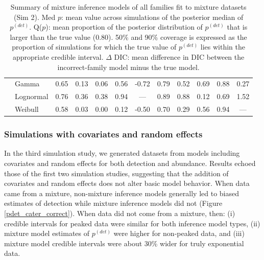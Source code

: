 \documentclass[useAMS,usenatbib,referee,12pt]{article}
\begin{document}
\begin{table}[ht]
\begin{tabular}{l|l|ccccc|ccccc}
\cline{2-12}
\parbox[t]{2mm}{} & Gamma & 0.65 & 0.13 & 0.06 & 0.56 & -0.72 & 0.79 & 0.52 & 0.69 & 0.88 & 0.27 \\ 
&   Lognormal & 0.76 & 0.36 & 0.38 & 0.94 & --- & 0.89 & 0.88 & 0.12 & 0.69 & 1.52 \\ 
&   Weibull & 0.58 & 0.03 & 0.00 & 0.12 & -0.50 & 0.70 & 0.29 & 0.56 & 0.94 & --- \\ 
   \hline
\end{tabular}
\caption{\label{tbl:sim2} Summary of mixture inference models of all families fit to mixture datasets (Sim 2).   Med $p$: mean value across simulations of the posterior median of $p^{(det)}$.  Q($p$): mean proportion of the posterior distribution of $p^{(det)}$ that is larger than the true value (0.80).  50\% and 90\% coverage is expressed as the proportion of simulations for which the true value of $p^{(det)}$ lies within the appropriate credible interval.  $\Delta$ DIC: mean difference in DIC between the incorrect-family model minus the true model.}
\end{table}



\subsubsection{Simulations with covariates and random effects}\label{sec:simfull}

In the third simulation study, we generated datasets from models including covariates and random effects for both detection and abundance.  Results echoed those of the first two simulation studies, suggesting that the addition of covariates and random effects does not alter basic model behavior.  When data came from a mixture, non-mixture inference models generally led to biased estimates of detection while mixture inference models did not (Figure \ref{pdet_cater_correct}).  When data did not come from a mixture, then: (i) credible intervals for peaked data were similar for both inference model types, (ii) mixture model estimates of $p^{(det)}$ were higher for non-peaked data, and (iii) mixture model credible intervals were about 30\% wider for truly exponential data.
\end{document}
